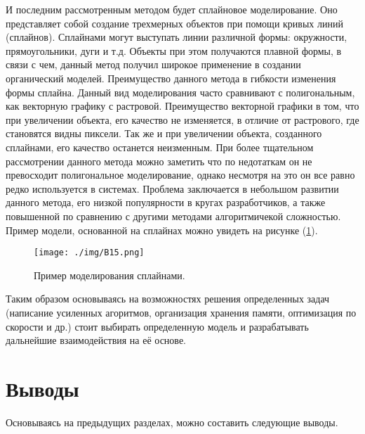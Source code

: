 И последним рассмотренным методом будет сплайновое моделирование. Оно представляет собой создание трехмерных объектов при помощи кривых линий (сплайнов). Сплайнами могут выступать линии различной формы: окружности, прямоугольники, дуги и т.д. Объекты при этом получаются плавной формы, в связи с чем, данный метод получил широкое применение в создании органический моделей. Преимущество данного метода в гибкости изменения формы сплайна. Данный вид моделирования часто сравнивают с полигональным, как векторную графику с растровой. Преимущество векторной графики в том, что при увеличении объекта, его качество не изменяется, в отличие от растрового, где становятся видны пиксели. Так же и при увеличении объекта, созданного сплайнами, его качество останется неизменным. При более тщательном рассмотрении данного метода можно заметить что по недотаткам он не превосходит полигональное моделирование, однако несмотря на это он все равно редко используется в системах. Проблема заключается в небольшом развитии данного метода, его низкой популярности в кругах разработчиков, а также повышенной по сравнению с другими методами алгоритмичекой сложностью. Пример модели, основанной на сплайнах можно увидеть на рисунке (\ref{pic:B15}).

\begin{figure} 
\begin{center}
\texttt{[image: ./img/B15.png]}
\end{center}
\caption{Пример моделирования сплайнами.}
\label{pic:B15}
\end{figure}

Таким образом основываясь на возможностях решения определенных задач (написание усиленных агоритмов, организация хранения памяти, оптимизация по скорости и др.) стоит выбирать определенную модель и разрабатывать дальнейшие взаимодействия на её основе. 

\section{Выводы}

Основываясь на предыдущих разделах, можно составить следующие выводы.

